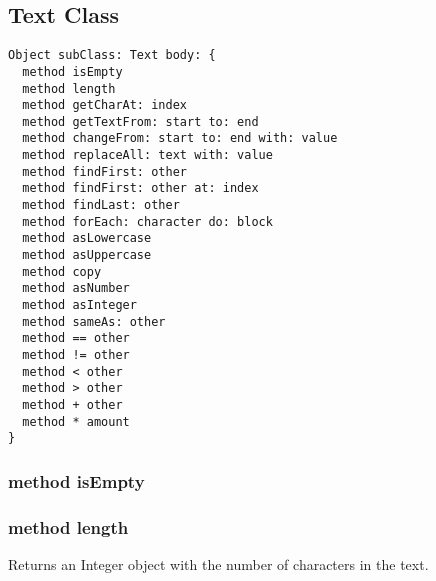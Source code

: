 \subsection {Text Class}

\begin{lstlisting}
Object subClass: Text body: {
  method isEmpty
  method length
  method getCharAt: index
  method getTextFrom: start to: end
  method changeFrom: start to: end with: value
  method replaceAll: text with: value
  method findFirst: other
  method findFirst: other at: index
  method findLast: other
  method forEach: character do: block
  method asLowercase
  method asUppercase
  method copy
  method asNumber
  method asInteger
  method sameAs: other
  method == other
  method != other
  method < other
  method > other
  method + other
  method * amount
}
\end{lstlisting}

\subsubsection{method isEmpty}

\subsubsection{method length}
Returns an Integer object with the number of characters in the text.
